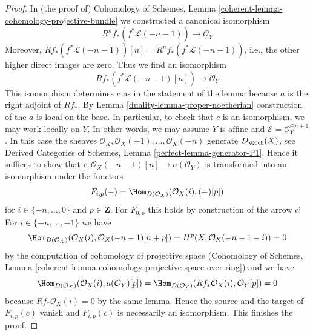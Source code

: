 \begin{proof}

In (the proof of) Cohomology of Schemes, Lemma
\ref{coherent-lemma-cohomology-projective-bundle}
we constructed a canonical isomorphism
$$
R^nf_*(f^*\mathcal{L}(-n - 1)) \longrightarrow \mathcal{O}_Y
$$
Moreover, $Rf_*(f^*\mathcal{L}(-n - 1))[n] = R^nf_*(f^*\mathcal{L}(-n - 1))$,
i.e., the other higher direct images are zero. Thus we find an isomorphism
$$
Rf_*(f^*\mathcal{L}(-n - 1)[n]) \longrightarrow \mathcal{O}_Y
$$
This isomorphism determines $c$ as in the statement of the lemma
because $a$ is the right adjoint of $Rf_*$.
By Lemma \ref{duality-lemma-proper-noetherian} construction of the $a$
is local on the base. In particular, to check that
$c$ is an isomorphism, we may work locally on $Y$.
In other words, we may assume $Y$ is affine and
$\mathcal{E} = \mathcal{O}_Y^{\oplus n + 1}$.
In this case the sheaves $\mathcal{O}_X, \mathcal{O}_X(-1), \ldots,
\mathcal{O}_X(-n)$ generate $D_\QCoh(X)$, see
Derived Categories of Schemes, Lemma \ref{perfect-lemma-generator-P1}.
Hence it suffices to show that
$c : \mathcal{O}_X(-n - 1)[n] \to a(\mathcal{O}_Y)$
is transformed into an isomorphism under the functors
$$
F_{i, p}(-) = \Hom_{D(\mathcal{O}_X)}(\mathcal{O}_X(i), (-)[p])
$$
for $i \in \{-n, \ldots, 0\}$ and $p \in \mathbf{Z}$.
For $F_{0, p}$ this holds by construction of the arrow $c$!
For $i \in \{-n, \ldots, -1\}$ we have
$$
\Hom_{D(\mathcal{O}_X)}(\mathcal{O}_X(i), \mathcal{O}_X(-n - 1)[n + p]) =
H^p(X, \mathcal{O}_X(-n - 1 - i)) = 0
$$
by the computation of cohomology of projective space
(Cohomology of Schemes, Lemma
\ref{coherent-lemma-cohomology-projective-space-over-ring})
and we have
$$
\Hom_{D(\mathcal{O}_X)}(\mathcal{O}_X(i), a(\mathcal{O}_Y)[p]) =
\Hom_{D(\mathcal{O}_Y)}(Rf_*\mathcal{O}_X(i), \mathcal{O}_Y[p]) = 0
$$
because $Rf_*\mathcal{O}_X(i) = 0$ by the same lemma.
Hence the source and the target of $F_{i, p}(c)$ vanish
and $F_{i, p}(c)$ is necessarily an isomorphism.
This finishes the proof.
\end{proof}

